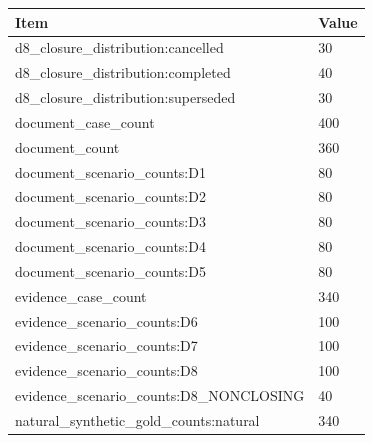 \begin{tabular}{ll}
\hline
Item & Value \\
\hline
d8\_closure\_distribution:cancelled & 30 \\
d8\_closure\_distribution:completed & 40 \\
d8\_closure\_distribution:superseded & 30 \\
document\_case\_count & 400 \\
document\_count & 360 \\
document\_scenario\_counts:D1 & 80 \\
document\_scenario\_counts:D2 & 80 \\
document\_scenario\_counts:D3 & 80 \\
document\_scenario\_counts:D4 & 80 \\
document\_scenario\_counts:D5 & 80 \\
evidence\_case\_count & 340 \\
evidence\_scenario\_counts:D6 & 100 \\
evidence\_scenario\_counts:D7 & 100 \\
evidence\_scenario\_counts:D8 & 100 \\
evidence\_scenario\_counts:D8\_NONCLOSING & 40 \\
natural\_synthetic\_gold\_counts:natural & 340 \\
\hline
\end{tabular}
